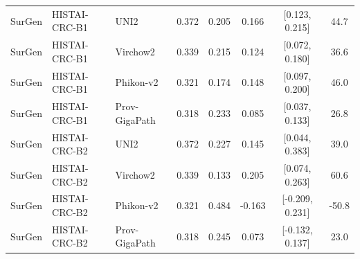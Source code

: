 \begin{table}[H]
{\begin{tabular}{l l l c c c c c}
\midrule
SurGen & HISTAI-CRC-B1 & UNI2 & 0.372 & 0.205 & 0.166 & [0.123, 0.215] & 44.7 \\
SurGen & HISTAI-CRC-B1 & Virchow2 & 0.339 & 0.215 & 0.124 & [0.072, 0.180] & 36.6 \\
SurGen & HISTAI-CRC-B1 & Phikon-v2 & 0.321 & 0.174 & 0.148 & [0.097, 0.200] & 46.0 \\
SurGen & HISTAI-CRC-B1 & Prov-GigaPath & 0.318 & 0.233 & 0.085 & [0.037, 0.133] & 26.8 \\
\midrule
SurGen & HISTAI-CRC-B2 & UNI2 & 0.372 & 0.227 & 0.145 & [0.044, 0.383] & 39.0 \\
SurGen & HISTAI-CRC-B2 & Virchow2 & 0.339 & 0.133 & 0.205 & [0.074, 0.263] & 60.6 \\
SurGen & HISTAI-CRC-B2 & Phikon-v2 & 0.321 & 0.484 & -0.163 & [-0.209, 0.231] & -50.8 \\
SurGen & HISTAI-CRC-B2 & Prov-GigaPath & 0.318 & 0.245 & 0.073 & [-0.132, 0.137] & 23.0 \\
\midrule
\bottomrule
\end{tabular}
}
\end{table}

